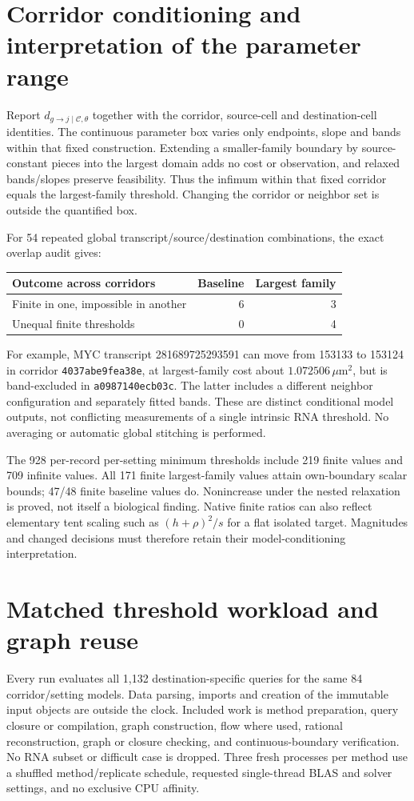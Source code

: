 \documentclass[10pt,letterpaper]{article}
\begin{document}
\section{Corridor conditioning and interpretation of the parameter range}
Report $d_{g\to j\mid\mathcal C,\theta}$ together with the corridor, source-cell and destination-cell identities. The continuous parameter box varies only endpoints, slope and bands within that fixed construction. Extending a smaller-family boundary by source-constant pieces into the largest domain adds no cost or observation, and relaxed bands/slopes preserve feasibility. Thus the infimum within that fixed corridor equals the largest-family threshold. Changing the corridor or neighbor set is outside the quantified box.

For 54 repeated global transcript/source/destination combinations, the exact overlap audit gives:
\begin{center}
\begin{tabular}{lrr}\toprule
Outcome across corridors & Baseline & Largest family\\\midrule
Finite in one, impossible in another &6&3\\
Unequal finite thresholds &0&4\\\bottomrule
\end{tabular}
\end{center}
For example, MYC transcript 281689725293591 can move from 153133 to 153124 in corridor \texttt{4037abe9fea38e}, at largest-family cost about $1.072506\,\mu$m$^2$, but is band-excluded in \texttt{a0987140ecb03c}. The latter includes a different neighbor configuration and separately fitted bands. These are distinct conditional model outputs, not conflicting measurements of a single intrinsic RNA threshold. No averaging or automatic global stitching is performed.

The 928 per-record per-setting minimum thresholds include 219 finite values and 709 infinite values. All 171 finite largest-family values attain own-boundary scalar bounds; 47/48 finite baseline values do. Nonincrease under the nested relaxation is proved, not itself a biological finding. Native finite ratios can also reflect elementary tent scaling such as $(h+\rho)^2/s$ for a flat isolated target. Magnitudes and changed decisions must therefore retain their model-conditioning interpretation.

\section{Matched threshold workload and graph reuse}
Every run evaluates all 1,132 destination-specific queries for the same 84 corridor/setting models. Data parsing, imports and creation of the immutable input objects are outside the clock. Included work is method preparation, query closure or compilation, graph construction, flow where used, rational reconstruction, graph or closure checking, and continuous-boundary verification. No RNA subset or difficult case is dropped. Three fresh processes per method use a shuffled method/replicate schedule, requested single-thread BLAS and solver settings, and no exclusive CPU affinity.
\end{document}
